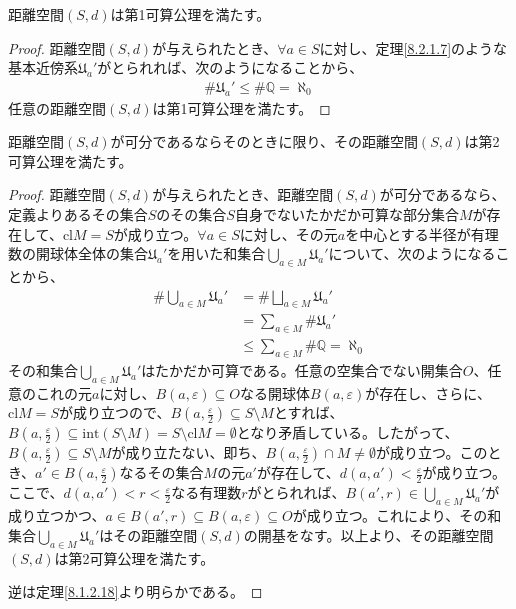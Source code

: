 \documentclass[dvipdfmx]{jsarticle}
\begin{document}
\begin{thm}\label{8.2.1.8} 距離空間$(S,d)$は第1可算公理を満たす。
\end{thm}
\begin{proof}
距離空間$(S,d)$が与えられたとき、$\forall a \in S$に対し、定理\ref{8.2.1.7}のような基本近傍系$\mathfrak{U}_{a}'$がとられれば、次のようになることから、
\begin{align*}
{\#}\mathfrak{U}_{a}' \leq {\#}\mathbb{Q} = \aleph_{0}
\end{align*}
任意の距離空間$(S,d)$は第1可算公理を満たす。
\end{proof}
\begin{thm}\label{8.2.1.9}
距離空間$(S,d)$が可分であるならそのときに限り、その距離空間$(S,d)$は第2可算公理を満たす。
\end{thm}
\begin{proof}
距離空間$(S,d)$が与えられたとき、距離空間$(S,d)$が可分であるなら、定義よりあるその集合$S$のその集合$S$自身でないたかだか可算な部分集合$M$が存在して、${\mathrm{cl}}M = S$が成り立つ。$\forall a \in S$に対し、その元$a$を中心とする半径が有理数の開球体全体の集合$\mathfrak{U}_{a}'$を用いた和集合$\bigcup_{a \in M} \mathfrak{U}_{a}'$について、次のようになることから、
\begin{align*}
{\#}{\bigcup_{a \in M} \mathfrak{U}_{a}'} &= {\#}{\bigsqcup_{a \in M} \mathfrak{U}_{a}'}\\
&= \sum_{a \in M} {{\#}\mathfrak{U}_{a}'}\\
&\leq \sum_{a \in M} {{\#}\mathbb{Q}} = \aleph_{0}
\end{align*}
その和集合$\bigcup_{a \in M} \mathfrak{U}_{a}'$はたかだか可算である。任意の空集合でない開集合$O$、任意のこれの元$a$に対し、$B(a,\varepsilon) \subseteq O$なる開球体$B(a,\varepsilon)$が存在し、さらに、${\mathrm{cl}}M = S$が成り立つので、$B\left( a,\frac{\varepsilon}{2} \right) \subseteq S \setminus M$とすれば、$B\left( a,\frac{\varepsilon}{2} \right) \subseteq {\mathrm{int}}(S \setminus M) = S \setminus {\mathrm{cl}}M = \emptyset$となり矛盾している。したがって、$B\left( a,\frac{\varepsilon}{2} \right) \subseteq S \setminus M$が成り立たない、即ち、$B\left( a,\frac{\varepsilon}{2} \right) \cap M \neq \emptyset$が成り立つ。このとき、$a' \in B\left( a,\frac{\varepsilon}{2} \right)$なるその集合$M$の元$a'$が存在して、$d\left( a,a' \right) < \frac{\varepsilon}{2}$が成り立つ。ここで、$d\left( a,a' \right) < r < \frac{\varepsilon}{2}$なる有理数$r$がとられれば、$B\left( a',r \right) \in \bigcup_{a \in M} \mathfrak{U}_{a}'$が成り立つかつ、$a \in B\left( a',r \right) \subseteq B(a,\varepsilon) \subseteq O$が成り立つ。これにより、その和集合$\bigcup_{a \in M} \mathfrak{U}_{a}'$はその距離空間$(S,d)$の開基をなす。以上より、その距離空間$(S,d)$は第2可算公理を満たす。\par
逆は定理\ref{8.1.2.18}より明らかである。
\end{proof}
\end{document}
